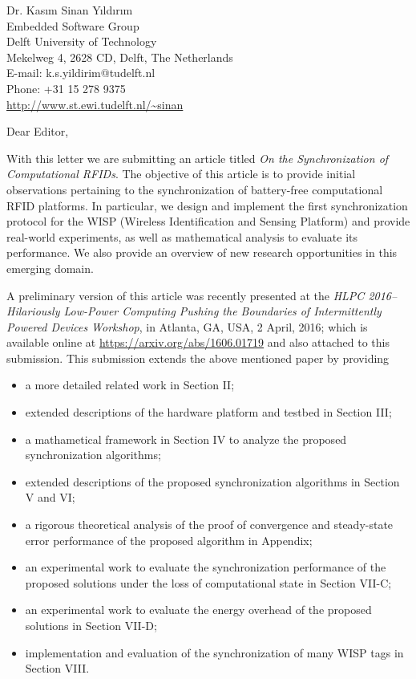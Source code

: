 \documentclass[11pt]{article}
\makeatletter
\def\Who{Dr. Kas{\i}m Sinan Y{\i}ld{\i}r{\i}m}
\def\What{}
\def\Where{Embedded Software Group}
\def\Affiliation{Delft University of Technology}
\def\Address{Mekelweg 4, 2628 CD, Delft, The Netherlands}
\def\Email{E-mail:  k.s.yildirim@tudelft.nl}
\def\Telephone{Phone: +31 15 278 9375}
\def\Webpage{\url{http://www.st.ewi.tudelft.nl/~sinan}}
\def\Sender{
	
	\begin{flushright}
		\Who \What \\
		\Where \\
		\Affiliation \\
		\Address \\
		\Email \\
		\Telephone \\
		\Webpage
	\end{flushright}	
}
\makeatother
\begin{document}
	
	\thispagestyle{empty}
	
	\Sender
	
	\bigskip
	
	
	Dear Editor,
	
	With this letter we are submitting an article titled \emph{On the Synchronization of Computational RFIDs}.
	The objective of this article is to provide initial observations pertaining to 
	the synchronization of battery-free computational RFID platforms. In 
	particular, we design and implement the first synchronization protocol for the 
	WISP (Wireless 
	Identification and Sensing Platform) and provide real-world experiments, as 
	well as mathematical analysis to evaluate its performance. We also 
	provide an overview of new 
	research opportunities in this emerging domain.
	
	
	
	A preliminary version of this article was recently presented at the \emph{HLPC 
		2016--Hilariously 
		Low-Power Computing Pushing the Boundaries of Intermittently Powered Devices 
		Workshop}, 
	in Atlanta, GA, USA, 2 April, 2016; which is available online at 
	\href{https://arxiv.org/abs/1606.01719}{https://arxiv.org/abs/1606.01719} and 
	also attached to this submission. This submission extends the above mentioned 
	paper by providing 
	\begin{itemize}
		\item a more detailed related work in Section II;
		\item extended descriptions of the hardware platform and testbed in Section 
		III;
		\item a mathametical framework in Section IV to analyze the proposed 
		synchronization algorithms;
		\item extended descriptions of the proposed synchronization algorithms in 
		Section V and VI;
		\item a rigorous theoretical analysis of the proof of convergence and 
		steady-state error performance of the proposed algorithm in Appendix;
		\item an experimental work to evaluate the synchronization
		performance of the proposed solutions under the loss of computational 
		state in Section VII-C;	
		\item an experimental work to evaluate the energy overhead of the proposed solutions in Section VII-D;	
		\item implementation and evaluation of the synchronization of 
		many WISP tags in Section VIII.
	\end{itemize}
	
\end{document}

